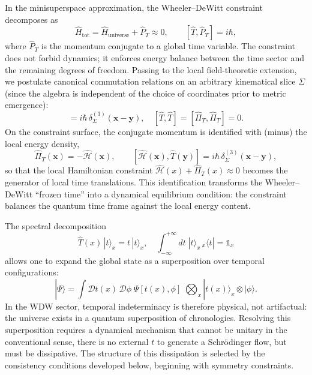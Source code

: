 \documentclass[12pt,a4paper]{article}
\numberwithin{equation}{section}
\begin{document}
\noindent In the minisuperspace approximation, the Wheeler--DeWitt constraint
decomposes as
\begin{equation}
\hat{H}_{\text{tot}}=\hat{H}_{\text{universe}}+\hat{P}_T \approx 0, \qquad
[\hat{T},\hat{P}_T]=i\hbar,
\label{eq:minisspace-split}
\end{equation}
where $\hat{P}_T$ is the momentum conjugate to a global time variable. The
constraint does not forbid dynamics; it enforces energy balance between the
time sector and the remaining degrees of freedom. Passing to the local
field-theoretic extension, we postulate canonical commutation relations on an arbitrary
kinematical slice $\Sigma$ (since the algebra is independent of the choice of coordinates prior to metric emergence):
\begin{equation}
[\hat{T}(\mathbf{x}),\hat{\Pi}_T(\mathbf{y})]
= i\hbar\,\delta^{(3)}_{\Sigma}(\mathbf{x}-\mathbf{y}),\quad
[\hat{T},\hat{T}]=[\hat{\Pi}_T,\hat{\Pi}_T]=0.
\label{eq:canonical-commutators}
\end{equation}
On the constraint surface, the conjugate momentum is identified with (minus) the local energy density,
\begin{equation}
\hat{\Pi}_T(\mathbf{x})=-\hat{\mathcal{H}}(\mathbf{x}),\qquad
[\hat{\mathcal{H}}(\mathbf{x}),\hat{T}(\mathbf{y})]
= i\hbar\,\delta^{(3)}_{\Sigma}(\mathbf{x}-\mathbf{y}),
\label{eq:conjugacy}
\end{equation}
so that the local Hamiltonian constraint
$\hat{\mathcal{H}}(x)+\hat{\Pi}_T(x)\approx 0$ becomes the generator of
local time translations. This identification transforms the Wheeler--DeWitt
``frozen time'' into a dynamical equilibrium condition: the constraint
balances the quantum time frame against the local energy content.

\noindent The spectral decomposition
\begin{equation}
\hat{T}(x)\,|t\rangle_x = t\,|t\rangle_x, \quad
\int_{-\infty}^{+\infty}\!dt\; |t\rangle_x\,{}_x\langle t| = \mathbb{1}_x
\label{eq:decomposition}
\end{equation}
allows one to expand the global state as a superposition over temporal
configurations:
\begin{equation}
|\Psi\rangle = \!\int\!\mathcal{D}t(x)\,\mathcal{D}\phi\;
\Psi[t(x),\phi]\;\bigotimes_x |t(x)\rangle_x\!\otimes|\phi\rangle.
\label{eq:expansion}
\end{equation}
In the WDW sector, temporal indeterminacy is therefore physical, not
artifactual: the universe exists in a quantum superposition of chronologies.
Resolving this superposition requires a dynamical mechanism that cannot be
unitary in the conventional sense, there is no external $t$ to generate a
Schr\"odinger flow, but must be dissipative. The structure of this dissipation is selected by the
consistency conditions developed below, beginning with symmetry
constraints.
\end{document}
